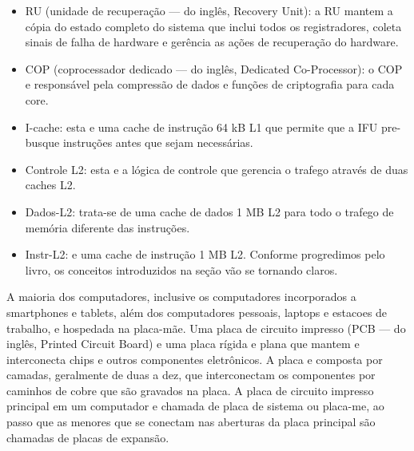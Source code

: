 \documentclass{article}
\begin{document}
\begin{itemize}
    \item RU (unidade de recuperação — do inglês, Recovery Unit): a RU mantem a
        cópia do estado completo do sistema que inclui todos os registradores,
        coleta sinais de falha de hardware e gerência as ações de recuperação
        do hardware.

    \item COP (coprocessador dedicado — do inglês, Dedicated Co-Processor): o
        COP e responsável pela compressão de dados e funções de criptografia
        para cada core.

    \item I-cache: esta e uma cache de instrução 64 kB L1 que permite que a IFU
        pre-busque instruções antes que sejam necessárias.

    \item Controle L2: esta e a lógica de controle que gerencia o trafego
        através de duas caches L2.

    \item Dados-L2: trata-se de uma cache de dados 1 MB L2 para todo o trafego
        de memória diferente das instruções.

    \item Instr-L2: e uma cache de instrução 1 MB L2. Conforme progredimos pelo
        livro, os conceitos introduzidos na seção vão se tornando claros.
\end{itemize}

A maioria dos computadores, inclusive os computadores incorporados a
smartphones e tablets, além dos computadores pessoais, laptops e estacoes de
trabalho, e hospedada na placa-mãe. Uma placa de circuito impresso (PCB — do
inglês, Printed Circuit Board) e uma placa rígida e plana que mantem e
interconecta chips e outros componentes eletrônicos. A placa e composta por
camadas, geralmente de duas a dez, que interconectam os componentes por
caminhos de cobre que são gravados na placa. A placa de circuito impresso
principal em um computador e chamada de placa de sistema ou placa-me, ao passo
que as menores que se conectam nas aberturas da placa principal são chamadas de
placas de expansão.
\end{document}
